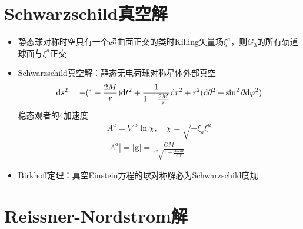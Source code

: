 \section{Schwarzschild真空解}

\begin{itemize}
    \item 静态球对称时空只有一个超曲面正交的类时Killing矢量场$\xi^a$，则$G_3$的所有轨道球面与$\xi^a$正交
    \item Schwarzschild真空解：静态无电荷球对称星体外部真空
    \begin{gather*}
        \mathrm{d} s^2=-(1-\frac{2M}{r}) \mathrm{d} t^2+\frac{1}{1-\frac{2M}{r}} \mathrm{d} r^2+r^2(\mathrm{d} \theta^2 + \sin^2 \theta \mathrm{d} \varphi^2)
    \end{gather*}
    稳态观者的4加速度
    \begin{gather*}
        A^a=\nabla^a \ln \chi,\quad \chi=\sqrt{-\xi_a \xi^a}
        \\
        |A^a|=|\bm{g}|=\frac{GM}{r^2\sqrt{1-\frac{2GM}{c^2 r}}}
    \end{gather*}
    \item Birkhoff定理：真空Einstein方程的球对称解必为Schwarzschild度规
\end{itemize}

\section{Reissner-Nordstrom解}

